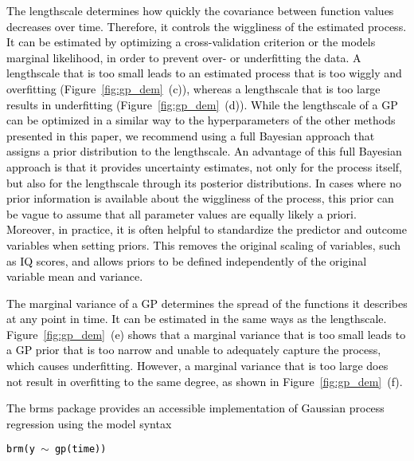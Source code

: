 \documentclass[man, floatsintext]{apa7}
\begin{document}
\textcolor{black}{
  The lengthscale determines how quickly the covariance between function values
  decreases over time. Therefore, it controls the wiggliness of the estimated
  process. It can be estimated by optimizing a cross-validation criterion or
  the models marginal likelihood, in order to prevent over- or underfitting
  the data. A lengthscale that is too small leads to an estimated process that
  is too wiggly and overfitting (Figure~\ref{fig:gp_dem}~(c)), whereas a
  lengthscale that is too large results in underfitting
  (Figure~\ref{fig:gp_dem}~(d)). While the lengthscale of a GP can be optimized
  in a similar way to the hyperparameters of the other methods presented in
  this paper, we recommend using a full Bayesian approach that assigns a prior
  distribution to the lengthscale. An advantage of this full Bayesian approach
  is that it provides uncertainty estimates, not only for the process itself,
  but also for the lengthscale through its posterior distributions. In cases
  where no prior information is available about the wiggliness of the process,
  this prior can be vague to assume that all parameter values are equally
  likely a priori. Moreover, in practice, it is often helpful to standardize
  the predictor and outcome variables when setting priors. This removes the
  original scaling of variables, such as IQ scores, and allows priors to be
  defined independently of the original variable mean and variance.
}

\textcolor{black}{
  The marginal variance of a GP determines the spread of the functions it
  describes at any point in time. It can be estimated in the same ways as the
  lengthscale. Figure~\ref{fig:gp_dem}~(e) shows that a marginal variance that
  is too small leads to a GP prior that is too narrow and unable to adequately
  capture the process, which causes underfitting. However, a marginal variance
  that is too large does not result in overfitting to the same degree, as shown
  in Figure~\ref{fig:gp_dem}~(f).
}

\textcolor{black}{
  The brms package \parencite{burkner_brms_2017} provides an accessible
  implementation of
  Gaussian process regression using the model syntax}

\noindent
\textcolor{black}{\fontsize{10}{12}\selectfont\texttt{brm(y $\sim$ gp(time))}}
\end{document}
